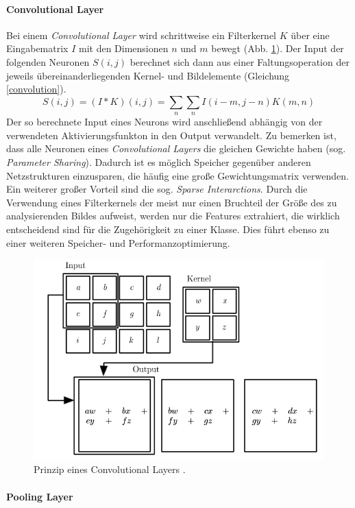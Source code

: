 \paragraph{Convolutional Layer}
Bei einem \textit{Convolutional Layer} wird schrittweise ein Filterkernel $K$ über eine Eingabematrix $I$ mit den Dimensionen $n$ und $m$ bewegt (Abb. \ref{dlmlunterschied}). Der Input der folgenden Neuronen $S(i,j)$ berechnet sich dann aus einer Faltungsoperation der jeweils übereinanderliegenden Kernel- und Bildelemente (Gleichung \ref{convolution}). 
\begin{equation}\label{convolution}
	S(i,j)=(I\ast K)(i,j)=\sum_{n}\sum_{n} I(i-m,j-n)K(m,n)
\end{equation}
Der so berechnete Input eines Neurons wird anschließend abhängig von der verwendeten Aktivierungsfunkton in den Output verwandelt. Zu bemerken ist, dass alle Neuronen eines \textit{Convolutional Layers} die gleichen Gewichte haben (sog. \textit{Parameter Sharing}). Dadurch ist es möglich Speicher gegenüber anderen Netzstrukturen einzusparen, die häufig eine große Gewichtungsmatrix verwenden. Ein weiterer großer Vorteil sind die sog. \textit{Sparse Interarctions}. Durch die Verwendung eines Filterkernels der meist nur einen Bruchteil der Größe des zu analysierenden Bildes aufweist, werden nur die Features extrahiert, die wirklich entscheidend sind für die Zugehörigkeit zu einer Klasse. Dies führt ebenso zu einer weiteren Speicher- und Performanzoptimierung.
\begin{figure}[h!]\label{dlmlunterschied}
  \centering
  \includegraphics[width=12cm]{cnn_prinzip.png}
  \caption{Prinzip eines Convolutional Layers \cite[S.330]{Goodfellow-et-al-2016}.}
\end{figure}
\paragraph{Pooling Layer}

